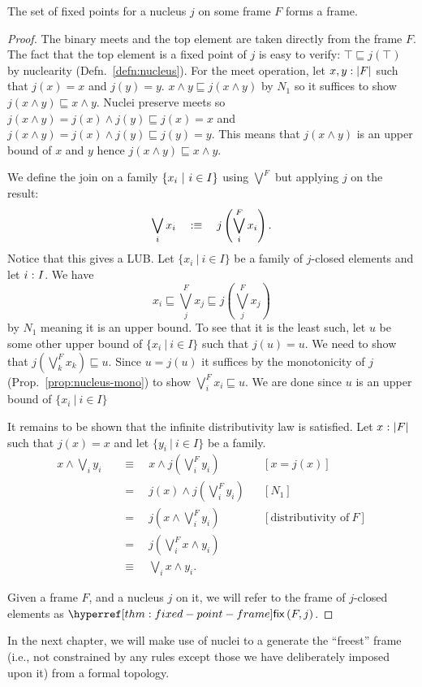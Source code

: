 \begin{thm}\label{thm:fixed-point-frame}
  The set of fixed points for a nucleus $j$ on some frame $F$ forms a frame.
\end{thm}
\begin{proof}
  The binary meets and the top element are taken directly from the frame $F$. The fact
  that the top element is a fixed point of $j$ is easy to verify: $\top \sqsubseteq j(\top)$ by nuclearity
  (Defn.~\ref{defn:nucleus}). For the meet operation, let $x, y:\left| F \right|$ such
  that $j(x) = x$ and $j(y) = y$. $x \wedge y \sqsubseteq j(x \wedge y)$ by $N_1$ so it suffices to show $j(x
  \wedge y) \sqsubseteq x \wedge y$. Nuclei preserve meets so $j(x \wedge y) = j(x) \wedge j(y) \sqsubseteq j(x) = x$ and $j(x \wedge
  y) = j(x) \wedge j(y) \sqsubseteq j(y) = y$. This means that $j(x \wedge y)$ is an upper bound of $x$ and
  $y$ hence $j(x \wedge y) \sqsubseteq x \wedge y$.

  We define the join on a family $\left\{  x_i ~|~ i \in I  \right\}$ using $\bigvee^F$ but applying $j$ on
  the result:
  \begin{equation*}
    \bigvee_i x_i \quad:\equiv\quad j \left( \bigvee^F_i x_i \right).
  \end{equation*}
  Notice that this gives a LUB. Let $\{ x_i ~|~ i \in I \}$ be a family of $j$-closed
  elements and let $i\hspace{0.1mm}:\hspace{0.1mm}I$. We have
  \begin{equation*}
    x_i \sqsubseteq \bigvee^F_j x_j \sqsubseteq j\left( \bigvee^F_j x_j \right)
  \end{equation*}
  by $N_1$ meaning it is an upper bound. To see that it is the least such, let $u$ be some
  other upper bound of $\{ x_i ~|~ i \in I \}$ such that $j(u) = u$. We need to show that $j
  \left( \bigvee^F_k x_k \right) \sqsubseteq u$. Since $u = j(u)$ it suffices by the monotonicity of $j$
  (Prop.~\ref{prop:nucleus-mono}) to show $\bigvee^F_i x_i \sqsubseteq u$. We are done since $u$ is an
  upper bound of $\{ x_i ~|~ i \in I \}$

  It remains to be shown that the infinite distributivity law is satisfied. Let
  $x\hspace{0.1mm}:\hspace{0.1mm}\left| F \right|$ such that $j(x) = x$ and let $\{ y_i ~|~ i \in I \}$ be a family.
  \begin{align*}
    x \wedge \bigvee_i y_i
      &\quad\equiv\quad x    \wedge j\left( \bigvee^F_i y_i \right)      && [x = j(x)]                     \\
      &\quad=\quad j(x) \wedge j\left( \bigvee^F_i y_i \right)      && [N_1]                          \\
      &\quad=\quad j \left( x \wedge \bigvee^F_i y_i \right)        && [\text{distributivity of}\ F]  \\
      &\quad=\quad j \left( \bigvee^F_i x \wedge y_i \right)                                          \\
      &\quad\equiv\quad \bigvee_i x \wedge y_i                                                             .
  \end{align*}

  Given a frame $F$, and a nucleus $j$ on it, we will refer to the frame of $j$-closed
  elements as $\fix{F}{j}$.
\end{proof}

In the next chapter, we will make use of nuclei to a generate the ``freest'' frame (i.e.,
not constrained by any rules except those we have deliberately imposed upon it) from a
formal topology.

